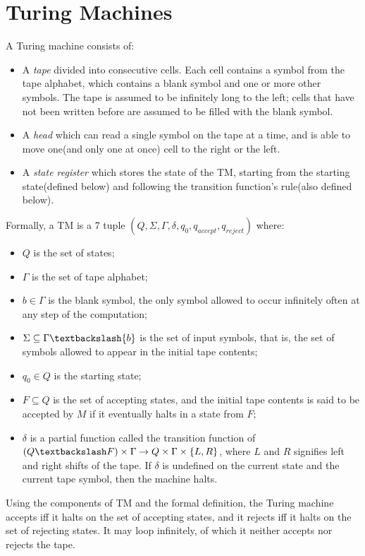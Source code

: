 \documentclass{report}
\begin{document}
	\section{Turing Machines}
		\begin{defn} \label{def_TM}
			A Turing machine consists of:
			\begin{itemize}
				\item A \emph{tape} divided into consecutive cells. Each cell contains a symbol from the tape alphabet, which contains a blank symbol and one or more other symbols. The tape is assumed to be infinitely long to the left; cells that have not been written before are assumed to be filled with the blank symbol.
				\item A \emph{head} which can read a single symbol on the tape at a time, and is able to move one(and only one at once) cell to the right or the left.
				\item A \emph{state register} which stores the state of the TM, starting from the starting state(defined below) and following the transition function's rule(also defined below).
			\end{itemize}
			Formally, a TM is a 7 tuple $(Q,\Sigma,\Gamma,\delta,q_0,q_{accept},q_{reject})$ where:
			\begin{itemize}
				\item $Q$ is the set of states;
				\item $\Gamma$ is the set of tape alphabet;
				\item $b \in \Gamma$ is the blank symbol, the only symbol allowed to occur infinitely often at any step of the computation;
				\item $\Sigma \subseteq \Gamma \textbackslash \{b\}$ is the set of input symbols, that is, the set of symbols allowed to appear in the initial tape contents;
				\item $q_0 \in Q$ is the starting state;
				\item $F \subseteq Q$ is the set of accepting states, and the initial tape contents is said to be accepted by $M$ if it eventually halts in a state from $F$;
				\item $\delta$ is a partial function called the transition function of $(Q \textbackslash F) \times \Gamma \rightarrow Q \times \Gamma \times \{L,R\}$, where $L$ and $R$ signifies left and right shifts of the tape. If $\delta$ is undefined on the current state and the current tape symbol, then the machine halts.
			\end{itemize}
			Using the components of TM and the formal definition, the Turing machine accepts iff it halts on the set of accepting states, and it rejects iff it halts on the set of rejecting states. It may loop infinitely, of which it neither accepts nor rejects the tape.
		\end{defn}
\end{document}

